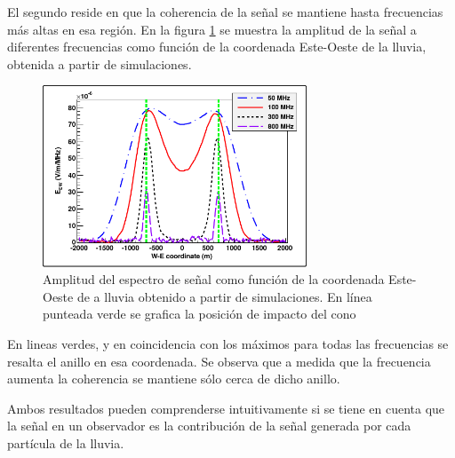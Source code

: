 	El segundo reside en que la coherencia de la señal se mantiene hasta frecuencias más altas en esa región.
	En la figura \ref{fig:chConeSig} se muestra la amplitud de la señal a diferentes frecuencias como función de la coordenada Este-Oeste de la lluvia, obtenida a partir de simulaciones.
	\begin{figure}[ht!]
	\centering
		\includegraphics[width=0.7\textwidth]{fig/EASRadio/chConeSig}
		\caption{\label{fig:chConeSig} Amplitud del espectro de se\~nal como funci\'on de la coordenada Este-Oeste de a lluvia obtenido a partir de simulaciones. En l\'inea punteada verde se grafica la posici\'on de impacto del cono \cher{}}
	\end{figure}
	En lineas verdes, y en coincidencia con los máximos para todas las frecuencias se resalta el anillo \cher{} en esa coordenada.
	Se observa que a medida que la frecuencia aumenta la coherencia se mantiene sólo cerca de dicho anillo.
	
	Ambos resultados pueden comprenderse intuitivamente si se tiene en cuenta que la señal en un observador es la contribución de la señal generada por cada partícula de la lluvia.
	
